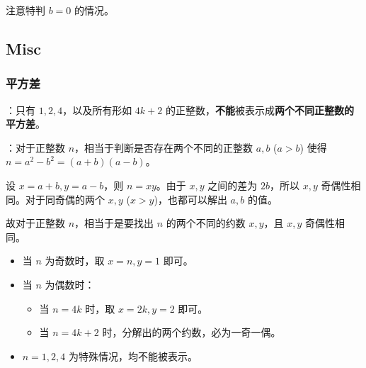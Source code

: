 注意特判 $b = 0$ 的情况。

\subsection{Misc}

\subsubsection{平方差}

：只有 $1, 2, 4$，以及所有形如 $4k + 2$ 的正整数，\textbf{不能}被表示成\textbf{两个不同正整数的平方差}。

：对于正整数 $n$，相当于判断是否存在两个不同的正整数 $a, b$ ($a > b$) 使得 $n = a^2 - b^2 = (a + b)(a - b)$。

设 $x = a + b, y = a - b$，则 $n = xy$。由于 $x, y$ 之间的差为 $2b$，所以 $x, y$ 奇偶性相同。对于同奇偶的两个 $x, y$ ($x > y$)，也都可以解出 $a, b$ 的值。

故对于正整数 $n$，相当于是要找出 $n$ 的两个不同的约数 $x, y$，且 $x, y$ 奇偶性相同。

\begin{itemize}
    \item 当 $n$ 为奇数时，取 $x = n, y = 1$ 即可。
    \item 当 $n$ 为偶数时：
    \begin{itemize}
        \item 当 $n = 4k$ 时，取 $x = 2k, y = 2$ 即可。
        \item 当 $n = 4k + 2$ 时，分解出的两个约数，必为一奇一偶。
    \end{itemize}
    \item $n = 1, 2, 4$ 为特殊情况，均不能被表示。
\end{itemize}
